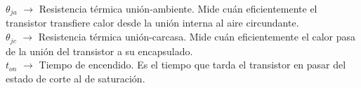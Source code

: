 \textbf{$\theta_{ja}$} $\rightarrow$ Resistencia térmica unión-ambiente. Mide cuán eficientemente el transistor transfiere calor desde la unión interna al aire circundante. \\

\textbf{$\theta_{jc}$} $\rightarrow$ Resistencia térmica unión-carcasa. Mide cuán eficientemente el calor pasa de la unión del transistor a su encapsulado. \\

\textbf{$t_{on}$} $\rightarrow$ Tiempo de encendido. Es el tiempo que tarda el transistor en pasar del estado de corte al de saturación. \\